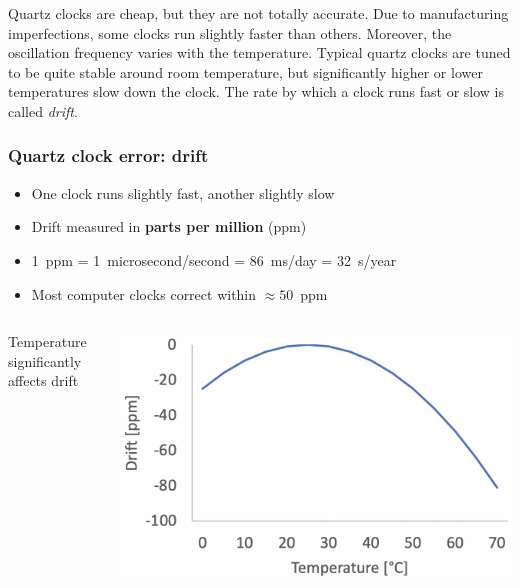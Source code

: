Quartz clocks are cheap, but they are not totally accurate.
Due to manufacturing imperfections, some clocks run slightly faster than others.
Moreover, the oscillation frequency varies with the temperature.
Typical quartz clocks are tuned to be quite stable around room temperature, but significantly higher or lower temperatures slow down the clock.
The rate by which a clock runs fast or slow is called \emph{drift}.

\pagebreak[3]
\begin{frame}
    \label{s:quartz-drift}
    \frametitle{Quartz clock error: drift}
    \begin{itemize}
        \item One clock runs slightly fast, another slightly slow
        \item Drift measured in \textbf{parts per million} (ppm)
        \item 1~ppm = 1~microsecond/second = 86~ms/day = 32~s/year
        \item Most computer clocks correct within $\approx 50$~ppm\\[1em]
    \end{itemize}
    \begin{columns}
        \begin{column}{0.2\textwidth}
            Temperature significantly affects drift
        \end{column}
        \begin{column}{0.75\textwidth}
            \includegraphics[width=\textwidth]{images/quartz-drift.png}
        \end{column}
    \end{columns}
\end{frame}
\label{l:quartz-drift}

